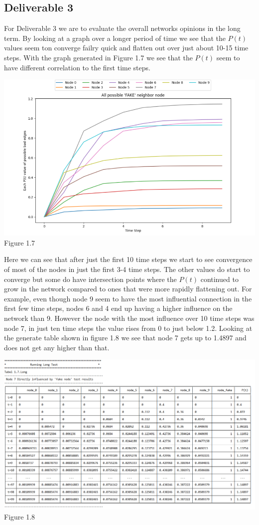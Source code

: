 \documentclass[letterpaper]{article}
\begin{document}
\subsection{ Deliverable 3}
For Deliverable 3 we are to evaluate the overall networks opinions in the long term. By looking at a graph over a longer period of time we see that the $P(t)$ values seem ton converge failry quick and flatten out over just about 10-15 time steps.  With the graph generated in Figure 1.7 we see that the $P(t)$ seem to have different correlation to the first time steps.
\begin{center}
	\includegraphics[scale=0.9]{./Images/Figure1.7} \\
	Figure 1.7
\end{center}
Here we can see that after just the first 10 time steps we start to see convergence of most of the nodes in just the first 3-4 time steps.  The other values do start to converge but some do have intersection points where the $P(t)$ continued to grow in the network compared to ones that were more rapidly flattening out.  For example, even though node 9 seem to have the most influential connection in the first few time steps, nodes 6 and 4 end up having a higher influence on the network than 9.  However the node with the most influence over 10 time steps was node 7, in just ten time steps the value rises from 0 to just below 1.2. Looking at the generate table shown in figure 1.8 we see that node 7 gets up to 1.4897 and does not get any higher than that.
\begin{center}
	\includegraphics[scale=0.6]{./Images/Figure1.8} \\
	Figure 1.8
\end{center}
\end{document}
